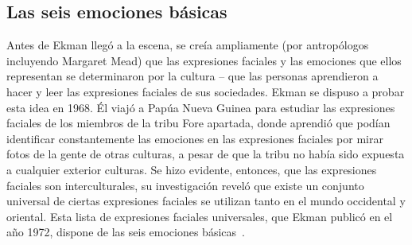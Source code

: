\subsection{Las seis emociones básicas}
Antes de Ekman llegó a la escena, se creía ampliamente (por antropólogos incluyendo Margaret Mead) que las expresiones faciales y las emociones que ellos representan se determinaron por la cultura – que las personas aprendieron a hacer y leer las expresiones faciales de sus sociedades. Ekman se dispuso a probar esta idea en 1968. Él viajó a Papúa Nueva Guinea para estudiar las expresiones faciales de los miembros de la tribu Fore apartada, donde aprendió que podían identificar constantemente las emociones en las expresiones faciales por mirar fotos de la gente de otras culturas, a pesar de que la tribu no había sido expuesta a cualquier exterior culturas. Se hizo evidente, entonces, que las expresiones faciales son interculturales, su investigación reveló que existe un conjunto universal de ciertas expresiones faciales se utilizan tanto en el mundo occidental y oriental. Esta lista de expresiones faciales universales, que Ekman publicó en el año 1972, dispone de las seis emociones básicas~\cite{29ekman2016scientists}.

